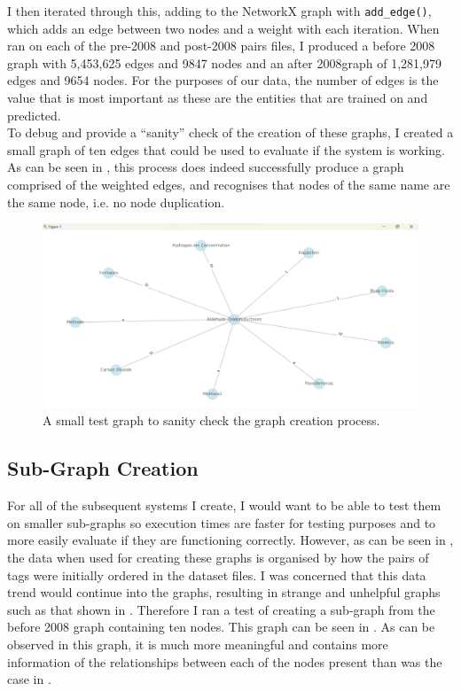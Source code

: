 \documentclass{l4proj}
\begin{document}
I then iterated through this, adding to the NetworkX graph with \texttt{add\_edge()},  which adds an edge between two nodes and a weight with each iteration. When ran on each of the pre-2008 and post-2008 pairs files, I produced a before 2008 graph with 5,453,625 edges and 9847 nodes and an after  2008graph of 1,281,979 edges and 9654 nodes. For the purposes of our data, the number of edges is the value that is most important as these are the entities that are trained on and predicted. \\

To debug and provide a ``sanity'' check of the creation of these graphs, I created a small graph of ten edges that could be used to evaluate if the system is working. As can be seen in , this process does indeed successfully produce a graph comprised of the weighted edges, and recognises that nodes of the same name are the same node, i.e. no node duplication. \\

\begin{figure}[h]
    \centering
    \includegraphics[width=\linewidth]{images/test_graph_creation.png}
    \caption{A small test graph to sanity check the graph creation process.}
    \label{fig:test_graph_creation}
\end{figure}

\subsection{Sub-Graph Creation} 

For all of the subsequent systems I create, I would want to be able to test them on smaller sub-graphs so execution times are faster for testing purposes and to more easily evaluate if they are functioning correctly. However, as can be seen in , the data when used for creating these graphs is organised by how the pairs of tags were initially ordered in the dataset files. I was concerned that this data trend would continue into the graphs, resulting in strange and unhelpful graphs such as that shown in . Therefore I ran a test of creating a sub-graph from the before 2008 graph containing ten nodes. This graph can be seen in . As can be observed in this graph, it is much more meaningful and contains more information of the relationships between each of the nodes present than was the case in . \\
\end{document}
